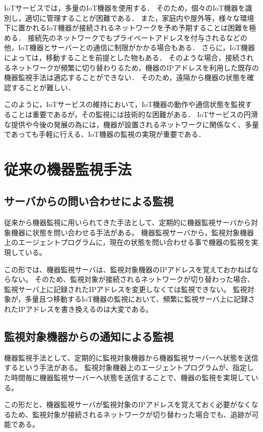 IoTサービスでは，多量のIoT機器を使用する．
そのため，個々のIoT機器を識別し，適切に管理することが困難である．
また，家庭内や屋外等，様々な環境下に置かれるIoT機器が接続されるネットワークを予め予期することは困難を極める．
接続先のネットワークでもプライベートアドレスを付与されるなどの他，IoT機器とサーバーとの通信に制限がかかる場合もある．
さらに，IoT機器によっては，移動することを前提とした物もある．
そのような場合，接続されるネットワークが頻繁に切り替わりるため，機器のIPアドレスを利用した既存の機器監視手法は適応することができない．
そのため，遠隔から機器の状態を確認することが難しい．
\medskip

このように，IoTサービスの維持において，IoT機器の動作や通信状態を監視することは重要であるが，その監視には技術的な困難がある．
IoTサービスの円滑な提供や今後の発展の為には，機器が設置されるネットワークに関係なく、多量であっても手軽に行える、IoT機器の監視の実現が重要である．


\section{従来の機器監視手法}
\subsection{サーバからの問い合わせによる監視}
	従来から機器監視に用いられてきた手法として、定期的に機器監視サーバから対象機器に状態を問い合わせる手法がある。
	機器監視サーバから，監視対象機器上のエージェントプログラムに，現在の状態を問い合わせる事で機器の監視を実現している。
	\medskip

	この形では、機器監視サーバは、監視対象機器のIPアドレスを覚えておかねばならない。
	そのため、監視対象が接続されるネットワークが切り替わった場合、監視サーバ上に記録されたIPアドレスを変更しなくては監視できない。
	監視対象が，多量且つ移動するIoT機器の監視において、頻繁に監視サーバ上に記録されたIPアドレスを書き換えるのは大変である。

\subsection{監視対象機器からの通知による監視}
	機器監視手法として、定期的に監視対象機器から機器監視サーバーへ状態を送信するという手法がある。
	監視対象機器上のエージェントプログラムが、指定した時間毎に機器監視サーバーへ状態を送信することで、機器の監視を実現している。
	\medskip

	この形だと、機器監視サーバが監視対象のIPアドレスを覚えておく必要がなくなるため、監視対象が接続されるネットワークが切り替わった場合でも、追跡が可能である。

